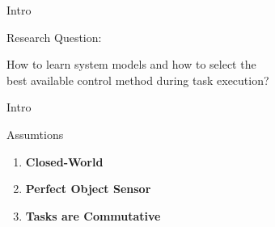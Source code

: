 \begin{frame}[fragile]{Intro}

  Research Question:\bs
  \begin{center}
  \large
  How to learn system models and how to select the\\ best available control method during task execution?\bs
  \end{center}
\end{frame}

\begin{frame}[fragile]{Intro}
  \begin{block}{Assumtions}
    \begin{enumerate}
      \item \textbf{Closed-World}\pause
      \item\textbf{Perfect Object Sensor}\pause
      \item\textbf{Tasks are Commutative}
    \end{enumerate}
  \end{block}
\end{frame}
